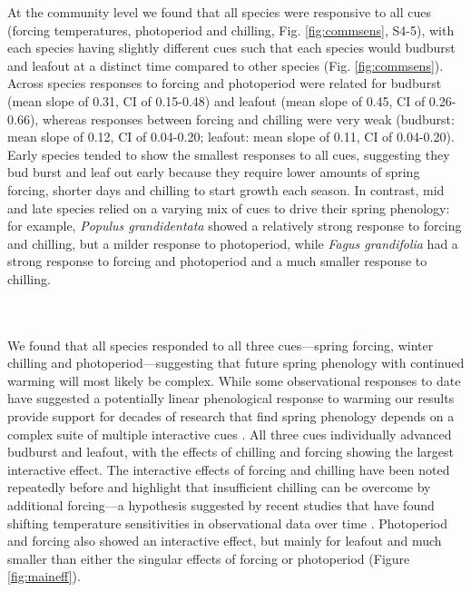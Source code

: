 \documentclass[11pt]{article}
\begin{document}
At the community level we found that all species were responsive to all cues (forcing temperatures, photoperiod and chilling, Fig. \ref{fig:commsens}, S4-5), with each species having slightly different cues such that each species would budburst and leafout at a distinct time compared to other species (Fig. \ref{fig:commsens}). Across species responses to forcing and photoperiod were related for budburst (mean slope of 0.31, CI of 0.15-0.48) and leafout (mean slope of 0.45, CI of 0.26-0.66), whereas responses between forcing and chilling were very weak (budburst: mean slope of 0.12, CI of 0.04-0.20; leafout: mean slope of 0.11, CI of 0.04-0.20). Early species tended to show the smallest responses to all cues, suggesting they bud burst and leaf out early because they require lower amounts of spring forcing, shorter days and chilling to start growth each season. In contrast, mid and late species relied on a varying mix of cues to drive their spring phenology: for example, \emph{Populus grandidentata} showed a relatively strong response to forcing and chilling, but a milder response to photoperiod, while \emph{Fagus grandifolia} had a strong response to forcing and photoperiod and a much smaller response to chilling.


\vspace{2ex}\\
\vspace{2ex}\\
We found that all species responded to all three cues---spring forcing, winter chilling and photoperiod---suggesting that future spring phenology with continued warming will most likely be complex. While some observational responses to date have suggested a potentially linear phenological response to warming \citep{Ellwood2012} our results provide support for decades of research that find spring phenology depends on a complex suite of multiple interactive cues \citep[e.g.,][]{Heide:1993,Caffarra:2011aa}. All three cues individually advanced budburst and leafout, with the effects of chilling and forcing showing the largest interactive effect. The interactive effects of forcing and chilling have been noted repeatedly before \citep[e.g.,][]{Heide:1993b,Caffarra:2011aa} and highlight that insufficient chilling can be overcome by additional forcing---a hypothesis suggested by recent studies that have found shifting temperature sensitivities in observational data over time \citep{yu2010,fu2015}. Photoperiod and forcing also showed an interactive effect, but mainly for leafout and much smaller than either the singular effects of forcing or photoperiod (Figure \ref{fig:maineff}). \\
\end{document}
